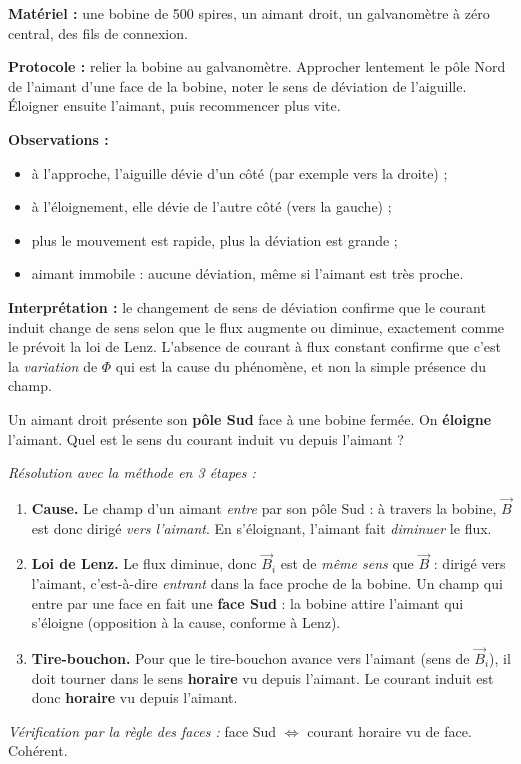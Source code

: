 \documentclass[11pt]{article}
\begin{document}
\begin{experience}
\textbf{Matériel :} une bobine de 500 spires, un aimant droit, un galvanomètre à zéro central, des fils de connexion.

\textbf{Protocole :} relier la bobine au galvanomètre. Approcher lentement le pôle Nord de l'aimant d'une face de la bobine, noter le sens de déviation de l'aiguille. Éloigner ensuite l'aimant, puis recommencer plus vite.

\textbf{Observations :}
\begin{itemize}
\item à l'approche, l'aiguille dévie d'un côté (par exemple vers la droite) ;
\item à l'éloignement, elle dévie de l'autre côté (vers la gauche) ;
\item plus le mouvement est rapide, plus la déviation est grande ;
\item aimant immobile : aucune déviation, même si l'aimant est très proche.
\end{itemize}

\textbf{Interprétation :} le changement de sens de déviation confirme que le courant induit change de sens selon que le flux augmente ou diminue, exactement comme le prévoit la loi de Lenz. L'absence de courant à flux constant confirme que c'est la \emph{variation} de $\Phi$ qui est la cause du phénomène, et non la simple présence du champ.
\end{experience}

\begin{exemplebox}
Un aimant droit présente son \textbf{pôle Sud} face à une bobine fermée. On \textbf{éloigne} l'aimant. Quel est le sens du courant induit vu depuis l'aimant ?

\textit{Résolution avec la méthode en 3 étapes :}
\begin{enumerate}
\item \textbf{Cause.} Le champ d'un aimant \emph{entre} par son pôle Sud : à travers la bobine, $\vec{B}$ est donc dirigé \emph{vers l'aimant}. En s'éloignant, l'aimant fait \emph{diminuer} le flux.
\item \textbf{Loi de Lenz.} Le flux diminue, donc $\vec{B}_i$ est de \emph{même sens} que $\vec{B}$ : dirigé vers l'aimant, c'est-à-dire \emph{entrant} dans la face proche de la bobine. Un champ qui entre par une face en fait une \textbf{face Sud} : la bobine attire l'aimant qui s'éloigne (opposition à la cause, conforme à Lenz).
\item \textbf{Tire-bouchon.} Pour que le tire-bouchon avance vers l'aimant (sens de $\vec{B}_i$), il doit tourner dans le sens \textbf{horaire} vu depuis l'aimant. Le courant induit est donc \textbf{horaire} vu depuis l'aimant.
\end{enumerate}
\textit{Vérification par la règle des faces :} face Sud $\Leftrightarrow$ courant horaire vu de face. Cohérent.
\end{exemplebox}
\end{document}
